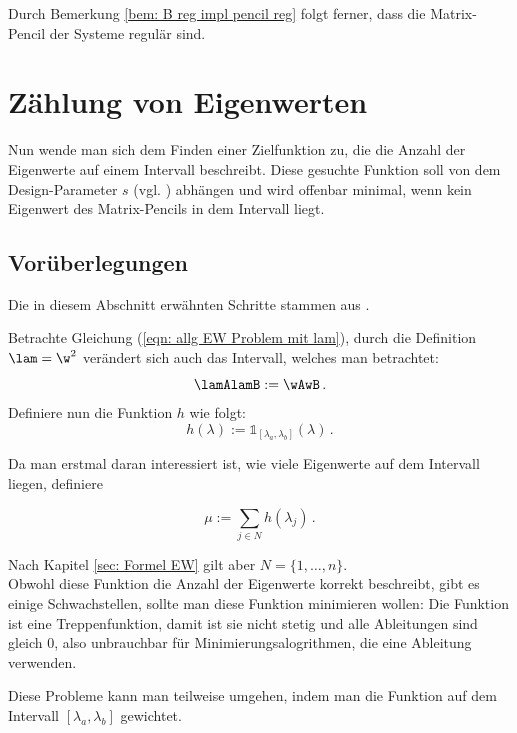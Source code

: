 \documentclass[a4paper,12pt]{report}
\newcommand{\1}{\mathds{1}}
\theoremstyle{plain} %
\theoremstyle{definition} %
\theoremstyle{remark}
\begin{document}
            Durch Bemerkung \ref{bem: B reg impl pencil reg} folgt ferner, dass die Matrix-Pencil der Systeme regulär sind.

\chapter{Zählung von Eigenwerten}
\label{sec: EW Zählung}
      Nun wende man sich dem Finden einer Zielfunktion zu, die die Anzahl der Eigenwerte auf einem Intervall beschreibt.
      Diese gesuchte Funktion soll von dem Design-Parameter $s$ (vgl. \cite[S. 2]{hauptteilTkachuk}) abhängen und wird offenbar minimal,
      wenn kein Eigenwert des Matrix-Pencils in dem Intervall liegt.
      \section{Vorüberlegungen}
            Die in diesem Abschnitt erwähnten Schritte stammen aus \cite[S. 2-4]{hauptteilTkachuk}.

            Betrachte Gleichung (\ref{eqn: allg EW Problem mit lam}), durch die Definition $\lam = \w^2$ verändert sich auch das Intervall, welches man betrachtet:
            $$\lamAlamB:=\wAwB\,.$$
            Definiere nun die Funktion $h$ wie folgt:
            $$h(\lambda):=\1_{[\lambda_a,\lambda_b]}(\lambda)\,.$$

            Da man erstmal daran interessiert ist, wie viele Eigenwerte auf dem Intervall liegen, definiere

            $$\mu := \sum_{j\in N} h(\lambda_j)\,.$$

            Nach Kapitel \ref{sec: Formel EW} gilt aber $N=\{1,\dots,n\}$.\\
            Obwohl diese Funktion die Anzahl der Eigenwerte korrekt beschreibt, gibt es einige Schwachstellen, sollte man diese Funktion minimieren wollen:
            Die Funktion ist eine Treppenfunktion, damit ist sie nicht stetig und alle Ableitungen sind gleich 0, also unbrauchbar für Minimierungsalogrithmen, die eine Ableitung verwenden.

            Diese Probleme kann man teilweise umgehen, indem man die Funktion auf dem Intervall $[\lambda_a, \lambda_b]$ gewichtet.
\end{document}
